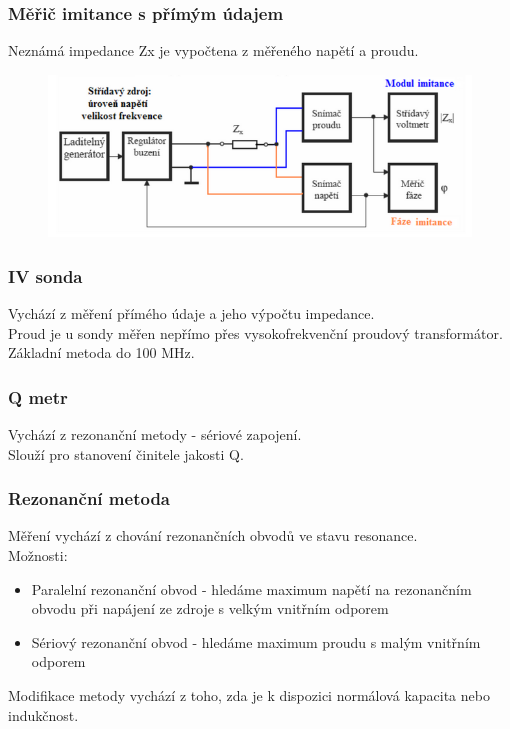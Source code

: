 \subsubsection{Měřič imitance s přímým údajem}
Neznámá impedance Zx je vypočtena z měřeného napětí a proudu.\\
\begin{figure}[h!]
    \centering
    \includegraphics[scale = 0.4]{images/ImitPrim.png}
\end{figure}

\subsubsection{IV sonda}
Vychází z měření přímého údaje a jeho výpočtu impedance.\\
Proud je u sondy měřen nepřímo přes vysokofrekvenční proudový transformátor.\\
Základní metoda do 100 MHz.\\

\subsubsection{Q metr}
Vychází z rezonanční metody - sériové zapojení.\\
Slouží pro stanovení činitele jakosti Q.\\

\subsubsection{Rezonanční metoda}
Měření vychází z chování rezonančních obvodů ve stavu resonance.\\
Možnosti:\\
\begin{itemize}
    \item Paralelní rezonanční obvod - hledáme maximum napětí na rezonančním obvodu při napájení ze zdroje s velkým vnitřním odporem
    \item Sériový rezonanční obvod - hledáme maximum proudu s malým vnitřním odporem
\end{itemize}
Modifikace metody vychází z toho, zda je k dispozici normálová kapacita nebo indukčnost.\\

